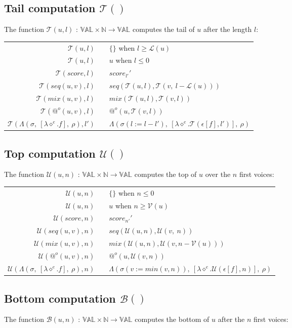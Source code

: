 \documentclass[10pt,a4paper,frenchb]{article}
\makeatletter
\newcommand{\evaltable}[1][$\rightarrow$]	  {\begin{center} \begin{tabular*}{\linewidth}{rc@{ #1 }l}}
\newcommand{\evaltablend}  		{\end{tabular*}\end{center}}
\newcommand{\var}[1]		{\ensuremath{\diamond^#1}}
\newcommand{\val}		{\ensuremath{\mathbb{VAL}}}
\newcommand{\clossym}	{\ensuremath{\Lambda}}
\newcommand{\applyop}	{\ensuremath{@}}
\newcommand{\noredex}	{\ensuremath{\applyop^o}}
\newcommand{\sdomain}[3]{$#1 \times #2 \rightarrow #3$}
\newcommand{\evalsym}			{\ensuremath{\epsilon}}
\newcommand{\envsym}				{\ensuremath{\rho}}
\newcommand{\closure}[4]			{\ensuremath{\clossym\left(#4,\ \left[\lambdaexpr{#1}{#2}\right],\ #3 \right)}}
\newcommand{\evalss}[1]				{\ensuremath{\evalsym\left[#1\right]}}
\newcommand{\apexpr}[1] 		{#1(u, v)}
\newcommand{\lambdaexpr}[2]	{\lambda \var{#1}.#2}
\newcommand{\length}			{\ensuremath{\mathcal L}}
\newcommand{\voices}			{\ensuremath{\mathcal V}}
\newcommand{\tail}			{\ensuremath{\mathcal T}}
\renewcommand{\top}			{\ensuremath{\mathcal U}}
\newcommand{\bottom}			{\ensuremath{\mathcal B}}
\newcommand{\bounds}			{\ensuremath{\sigma}}
\newcommand{\sevalTail}[2]				{\ensuremath{\tail \left(\evalss{#1},#2\right)}}
\newcommand{\sevalTop}[2]				{\ensuremath{\top \left(\evalss{#1},#2\right)}}
\newcommand{\tailScore}[2]		{\ensuremath{#1_{#2'}'}}
\newcommand{\tailSeq}[3]			{\ensuremath{seq\left(\tail\left(#1, #3\right), 
									\tail\left(#2, \ #3 - \length\left(#1\right)\right)\right)}}
\newcommand{\tailMix}[3]			{\ensuremath{mix\left(\tail\left(#1, #3\right), \tail\left(#2, #3\right)\right)}}
\newcommand{\tailApply}[3]		{\ensuremath{\noredex\left(#1, \tail\left(#2,#3\right)\right)}}
\newcommand{\tailClosure}[5][\envsym]		{\closure{#2}{\sevalTail{#3}{#5}}{#1}{#4(l:=l-#5)}}
\newcommand{\topScore}[2]		{\ensuremath{#1_{#2'}'}}
\newcommand{\topSeq}[3]			{\ensuremath{seq\left(\top\left(#1, #3\right), 
									\top\left(#2, \ #3\right)\right)}}
\newcommand{\topMix}[3]			{\ensuremath{mix\left(\top\left(#1, #3\right), 
									\top\left(#2, #3-\voices\left(#1\right)\right)\right)}}
\newcommand{\topApply}[3]		{\ensuremath{\noredex\left(#1, \top\left(#2,#3\right)\right)}}
\newcommand{\topClosure}[5][\envsym]		{\closure{#2}{\sevalTop{#3}{#5}}{#1}{#4(v:=min(v,#5))}}
\newcommand{\emptyScore}			{\ensuremath{\{\}}}
\newcommand{\identity}[1]		{\ensuremath{#1}}
\makeatother
\begin{document}
\subsection{Tail computation $\tail()$}
The function $\tail(u,l)$ :  \sdomain{\val}{\mathbb{N}}{\val} computes the tail of $u$ after the length $l$:

\evaltable
 \hline
 $\tail(u,l)$						& & \emptyScore \: when $l \geq \length(u)$ \\
 $\tail(u,l)$						& & \identity{u} \: when $l \leq 0 $ \\
 $\tail(score,l)$					& & \tailScore{score}{l} \\
 $\tail(\apexpr{seq},l)$			& & \tailSeq{u}{v}{l} \\
 $\tail(\apexpr{mix},l)$ 			& & \tailMix{u}{v}{l} \\
 $\tail(\noredex (u,v),l)$ 		& & \tailApply{u}{v}{l} \\
 $\tail(\closure{e}{f}{\envsym}{\bounds},l')$ 	& & \tailClosure{e}{f}{\bounds}{l'} \\
 \hline
\evaltablend

\subsection{Top computation $\top()$}
The function $\top(u,n)$ :  \sdomain{\val}{\mathbb{N}}{\val} computes the top of $u$ over the $n$ first voices:

\evaltable
 \hline
 $\top(u,n)$						& & \emptyScore \: when $n \leq 0$ \\
 $\top(u,n)$						& & \identity{u} \: when $n \geq \voices(u) $ \\
 $\top(score,n)$					& & \topScore{score}{n} \\
 $\top(\apexpr{seq},n)$			& & \topSeq{u}{v}{n} \\
 $\top(\apexpr{mix},n)$ 			& & \topMix{u}{v}{n} \\
 $\top(\noredex (u,v),n)$ 		& & \topApply{u}{v}{n} \\
 $\top(\closure{e}{f}{\envsym}{\bounds},n)$ 	& & \topClosure{e}{f}{\bounds}{n} \\
 \hline
\evaltablend

\subsection{Bottom computation $\bottom()$}
The function $\bottom(u,n)$ :  \sdomain{\val}{\mathbb{N}}{\val} computes the bottom of $u$ after the $n$ first voices:
\end{document}

